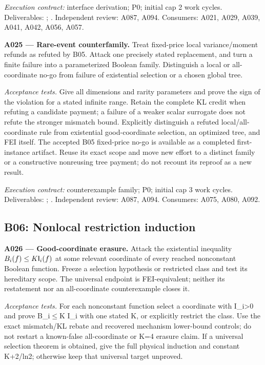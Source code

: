\documentclass[11pt]{article}
\begin{document}
{\small\emph{Execution contract:} interface derivation; P0; initial cap 2 work cycles. Deliverables: ; . Independent review: A087, A094. Consumers: A021, A029, A039, A041, A042, A056, A057.}

\textbf{A025 --- Rare-event counterfamily.} Treat fixed-price local variance/moment refunds as refuted by B05. Attack one precisely stated replacement, and turn a finite failure into a parameterized Boolean family. Distinguish a local or all-coordinate no-go from failure of existential selection or a chosen global tree.

\emph{Acceptance tests.} Give all dimensions and rarity parameters and prove the sign of the violation for a stated infinite range. Retain the complete KL credit when refuting a candidate payment; a failure of a weaker scalar surrogate does not refute the stronger mismatch bound. Explicitly distinguish a refuted local/all-coordinate rule from existential good-coordinate selection, an optimized tree, and FEI itself. The accepted B05 fixed-price no-go is available as a completed first-instance artifact. Reuse its exact scope and move new effort to a distinct family or a constructive nonreusing tree payment; do not recount its reproof as a new result.

{\small\emph{Execution contract:} counterexample family; P0; initial cap 3 work cycles. Deliverables: ; . Independent review: A087, A094. Consumers: A075, A080, A092.}

\subsection{B06: Nonlocal restriction induction}

\textbf{A026 --- Good-coordinate erasure.} Attack the existential inequality $B_i(f)\le K\mathsf I_i(f)$ at some relevant coordinate of every reached nonconstant Boolean function. Freeze a selection hypothesis or restricted class and test its hereditary scope. The universal endpoint is FEI-equivalent; neither its restatement nor an all-coordinate counterexample closes it.

\emph{Acceptance tests.} For each nonconstant function select a coordinate with I\_i>0 and prove B\_i$\le$K I\_i with one stated K, or explicitly restrict the class. Use the exact mismatch/KL rebate and recovered mechanism lower-bound controls; do not restart a known-false all-coordinate or K=4 erasure claim. If a universal selection theorem is obtained, give the full physical induction and constant K+2/ln2; otherwise keep that universal target unproved.
\end{document}

